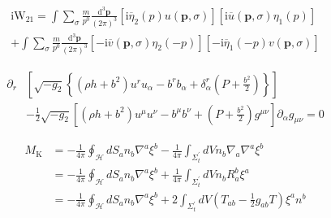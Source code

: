 \documentclass[11pt,a4paper]{book}
\begin{document}
\begin{equation}
    \left. \begin{array} { l } { \mathrm { i } \mathrm { W } _ { 21 } = \int \sum _ { \sigma } \frac { m } { p ^ { 0 } } \frac { \mathrm { d } ^ { 3 } \mathbf { p } } { ( 2 \pi ) ^ { 3 } } \left[ \mathrm { i } \overline { \eta } _ { 2 } ( p ) u ( \mathbf { p } , \sigma ) \right] \left[ \mathrm { i } \overline { u } ( \mathbf { p } , \sigma ) \eta _ { 1 } ( p ) \right] } \\ { + \int \sum _ { \sigma } \frac { m } { p ^ { 0 } } \frac { \mathrm { d } ^ { 3 } \mathbf { p } } { ( 2 \pi ) ^ { 3 } } \left[ - \mathrm { i } \overline { v } ( \mathbf { p } , \sigma ) \eta _ { 2 } ( - p ) \right] \left[ - \mathrm { i } \overline { \eta } _ { 1 } ( - p ) v ( \mathbf { p } , \sigma ) \right] } \end{array} \right.
\end{equation}

\begin{equation}
    \left.\begin{aligned} \partial _ { r } & \left[ \sqrt { - g _ { 2 } } \left\{ \left( \rho h + b ^ { 2 } \right) u ^ { r } u _ { \alpha } - b ^ { r } b _ { \alpha } + \delta _ { \alpha } ^ { r } \left( P + \frac { b ^ { 2 } } { 2 } \right) \right\} \right] \\& - \frac { 1 } { 2 } \sqrt { - g _ { 2 } } \left[ \left( \rho h + b ^ { 2 } \right) u ^ { \mu } u ^ { \nu } - b ^ { \mu } b ^ { \nu } + \left( P + \frac { b ^ { 2 } } { 2 } \right) g ^ { \mu \nu } \right] \partial _ { \alpha } g _ { \mu \nu } = 0 \end{aligned} \right.
\end{equation}


\begin{equation}
    \left.\begin{aligned} M _ { \mathrm { K } } & = - \frac { 1 } { 4 \pi } \oint _ { \mathcal { H } } d S _ { a } n _ { b } \nabla ^ { a } \xi ^ { b } - \frac { 1 } { 4 \pi } \int _ { \Sigma _ { t } ^ { \prime } } d V n _ { b } \nabla _ { a } \nabla ^ { a } \xi ^ { b } \\ & = - \frac { 1 } { 4 \pi } \oint _ { \mathcal { H } } d S _ { a } n _ { b } \nabla ^ { a } \xi ^ { b } + \frac { 1 } { 4 \pi } \int _ { \Sigma _ { t } ^ { \prime } } d V n _ { b } R _ { a } ^ { b } \xi ^ { a } \\ & = - \frac { 1 } { 4 \pi } \oint _ { \mathcal { H } } d S _ { a } n _ { b } \nabla ^ { a } \xi ^ { b } + 2 \int _ { \Sigma _ { t } ^ { \prime } } d V \left( T _ { a b } - \frac { 1 } { 2 } g _ { a b } T \right) \xi ^ { a } n ^ { b } \end{aligned} \right.
\end{equation}
	
\end{document}

